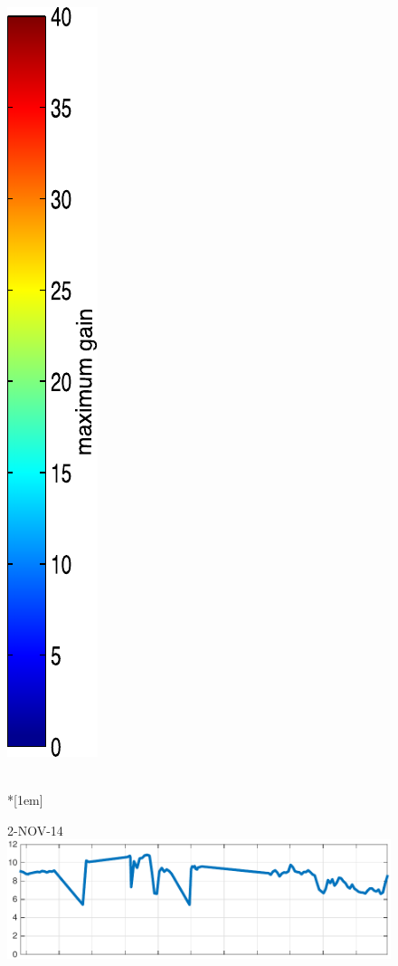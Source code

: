 \begin{figure}
\begin{minipage}[c]{\mylength}
\includegraphics[valign=t,trim=2pt -8pt 0 5pt,width=\colorbarwidth,totalheight=\eventheight]{events/colorbar-40.pdf}
\end{minipage} \\*[1em]
\begin{minipage}[c]{\mylength}
\centering \scriptsize 2-NOV-14 \\
\includegraphics[valign=t,trim=0 0 5pt 0,angle=90,origin=tr,width=\sunintwidth,totalheight=\eventheight]{events/20141102-intensity.pdf}

\end{minipage}
\end{figure}
